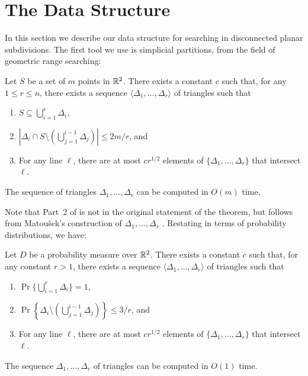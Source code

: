 \documentclass{patmorin}
\begin{document}
\section{The Data Structure}

In this section we describe our data structure for searching in disconnected
planar subdivisions.  The first tool we use is simplicial partitions,
from the field of geometric range searching:

\begin{thm}[Matou\v{s}ek 1991]
Let $S$ be a set of $m$ points in $\mathbb{R}^2$. There exists a constant
$c$ such that, for any $1\le r \le n$, there exists a sequence
$\langle \Delta_1,\ldots,\Delta_r\rangle$ of triangles such that
  \begin{enumerate}
    \item $S\subseteq \bigcup_{i=1}^r \Delta_i$,
  
    \item $\left|\Delta_i \cap S\setminus
    \left(\bigcup_{j=1}^{i-1}\Delta_j\right)\right| \le 2m/r$, and
  
    \item For any line $\ell$, there are at most $cr^{1/2}$ elements of
  $\{\Delta_1,\ldots,\Delta_r\}$ that intersect $\ell$.
  \end{enumerate}
  The sequence of triangles $\Delta_1,\ldots,\Delta_r$ can be computed
  in $O(m)$ time.
\end{thm}

Note that Part~2 of  is not in the original
statement of the theorem, but follows from Matou\v{s}ek's construction
of $\Delta_1,\ldots,\Delta_r$ \cite{m91}.
Restating  in terms of probability distributions,
we have:

\begin{thm}
Let $D$ be a probability measure over $\mathbb{R}^2$. There exists a constant
$c$ such that, for any constant $r>1$, there exists a sequence
$\langle \Delta_1,\ldots,\Delta_r\rangle$ of triangles such that
  \begin{enumerate}
    \item $\Pr\{\bigcup_{i=1}^r \Delta_i\} = 1$,
  
    \item $\Pr\left\{\Delta_i \setminus
    \left(\bigcup_{j=1}^{i-1}\Delta_j\right)\right\} \le 3/r$, and
  
    \item For any line $\ell$, there are at most $cr^{1/2}$ elements of
    $\{\Delta_1,\ldots,\Delta_r\}$ that intersect $\ell$.
  \end{enumerate}
  The sequence $\Delta_1,\ldots,\Delta_r$ of triangles can be computed
  in $O(1)$ time.
\end{thm}
\end{document}
